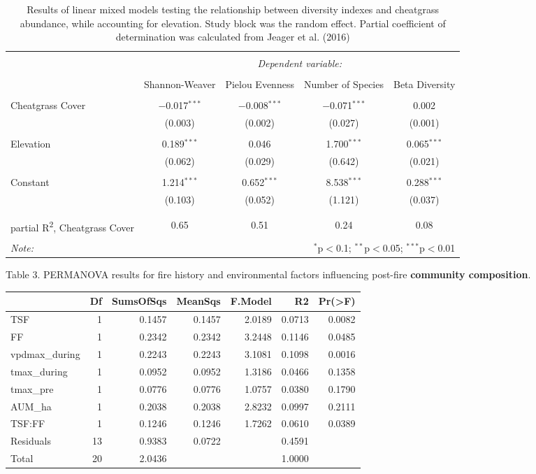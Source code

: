 \documentclass[8pt,]{article}
\begin{document}
\begin{table}[!htbp] \centering 
  \caption{Results of linear mixed models testing the relationship between diversity indexes and cheatgrass abundance, while accounting for elevation. Study block was the random effect. Partial coefficient of determination was calculated from Jeager et al. (2016)} 
  \label{} 
\begin{tabular}{@{\extracolsep{5pt}}lcccc} 
\\[-1.8ex]\hline 
\hline \\[-1.8ex] 
 & \multicolumn{4}{c}{\textit{Dependent variable:}} \\ 
\cline{2-5} 
\\[-1.8ex] & Shannon-Weaver & Pielou Evenness & Number of Species & Beta Diversity \\ 
\hline \\[-1.8ex] 
 Cheatgrass Cover & $-$0.017$^{***}$ & $-$0.008$^{***}$ & $-$0.071$^{***}$ & 0.002 \\ 
  & (0.003) & (0.002) & (0.027) & (0.001) \\ 
  & & & & \\ 
 Elevation & 0.189$^{***}$ & 0.046 & 1.700$^{***}$ & 0.065$^{***}$ \\ 
  & (0.062) & (0.029) & (0.642) & (0.021) \\ 
  & & & & \\ 
 Constant & 1.214$^{***}$ & 0.652$^{***}$ & 8.538$^{***}$ & 0.288$^{***}$ \\ 
  & (0.103) & (0.052) & (1.121) & (0.037) \\ 
  & & & & \\ 
\hline \\[-1.8ex] 
partial R\textsuperscript{2}, Cheatgrass Cover & 0.65 & 0.51 & 0.24 & 0.08 \\
\hline 
\hline \\[-1.8ex] 
\textit{Note:}  & \multicolumn{4}{r}{$^{*}$p$<$0.1; $^{**}$p$<$0.05; $^{***}$p$<$0.01} \\ 
\end{tabular} 
\end{table}

\clearpage
\newpage

Table 3. PERMANOVA results for fire history and environmental factors
influencing post-fire \textbf{community composition}.

\begin{longtable}[]{@{}lrrrrrr@{}}
\toprule
& Df & SumsOfSqs & MeanSqs & F.Model & R2 &
Pr(\textgreater{}F)\tabularnewline
\midrule
\endhead
TSF & 1 & 0.1457 & 0.1457 & 2.0189 & 0.0713 & 0.0082\tabularnewline
FF & 1 & 0.2342 & 0.2342 & 3.2448 & 0.1146 & 0.0485\tabularnewline
vpdmax\_during & 1 & 0.2243 & 0.2243 & 3.1081 & 0.1098 &
0.0016\tabularnewline
tmax\_during & 1 & 0.0952 & 0.0952 & 1.3186 & 0.0466 &
0.1358\tabularnewline
tmax\_pre & 1 & 0.0776 & 0.0776 & 1.0757 & 0.0380 &
0.1790\tabularnewline
AUM\_ha & 1 & 0.2038 & 0.2038 & 2.8232 & 0.0997 & 0.2111\tabularnewline
TSF:FF & 1 & 0.1246 & 0.1246 & 1.7262 & 0.0610 & 0.0389\tabularnewline
Residuals & 13 & 0.9383 & 0.0722 & & 0.4591 &\tabularnewline
Total & 20 & 2.0436 & & & 1.0000 &\tabularnewline
\bottomrule
\end{longtable}
\end{document}
